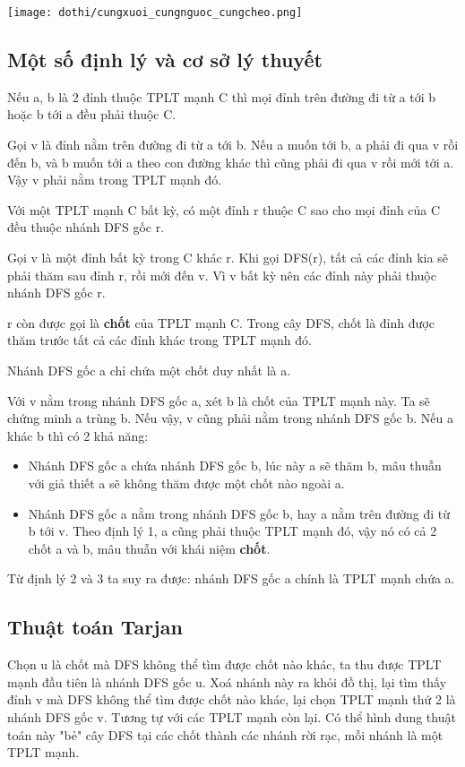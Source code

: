 \texttt{[image: dothi/cungxuoi\_cungnguoc\_cungcheo.png]}

\subsection{Một số định lý và cơ sở lý thuyết}

\begin{theorem}
    Nếu a, b là 2 đỉnh thuộc TPLT mạnh C thì mọi đỉnh trên đường đi từ a tới b hoặc b tới a đều phải thuộc C.
\end{theorem}

Gọi v là đỉnh nằm trên đường đi từ a tới b. Nếu a muốn tới b, a phải đi qua v rồi đến b, và b muốn tới a theo con đường khác thì cũng phải đi qua v rồi mới tới a. Vậy v phải nằm trong TPLT mạnh đó.

\begin{theorem}
    Với một TPLT mạnh C bất kỳ, có một đỉnh r thuộc C sao cho mọi đỉnh của C đều thuộc nhánh DFS gốc r.
\end{theorem}

Gọi v là một đỉnh bất kỳ trong C khác r. Khi gọi DFS(r), tất cả các đỉnh kia sẽ phải thăm sau đỉnh r, rồi mới đến v. Vì v bất kỳ nên các đỉnh này phải thuộc nhánh DFS gốc r.

r còn được gọi là \textbf{chốt} của TPLT mạnh C. Trong cây DFS, chốt là đỉnh được thăm trước tất cả các đỉnh khác trong TPLT mạnh đó.

\begin{theorem}
    Nhánh DFS gốc a chỉ chứa một chốt duy nhất là a.
\end{theorem}

Với v nằm trong nhánh DFS gốc a, xét b là chốt của TPLT mạnh này. Ta sẽ chứng minh a trùng b. Nếu vậy, v cũng phải nằm trong nhánh DFS gốc b. Nếu a khác b thì có 2 khả năng:
\begin{itemize}
    \item Nhánh DFS gốc a chứa nhánh DFS gốc b, lúc này a sẽ thăm b, mâu thuẫn với giả thiết a sẽ không thăm được một chốt nào ngoài a.
    \item Nhánh DFS gốc a nằm trong nhánh DFS gốc b, hay a nằm trên đường đi từ b tới v. Theo định lý 1, a cũng phải thuộc TPLT mạnh đó, vậy nó có cả 2 chốt a và b, mâu thuẫn với khái niệm \textbf{chốt}.
\end{itemize}

Từ định lý 2 và 3 ta suy ra được: nhánh DFS gốc a chính là TPLT mạnh chứa a.

\subsection{Thuật toán Tarjan}
Chọn u là chốt mà DFS không thể tìm được chốt nào khác, ta thu được TPLT mạnh đầu tiên là nhánh DFS gốc u. Xoá nhánh này ra khỏi đồ thị, lại tìm thấy đỉnh v mà DFS không thể tìm được chốt nào khác, lại chọn TPLT mạnh thứ 2 là nhánh DFS gốc v. Tương tự với các TPLT mạnh còn lại. Có thể hình dung thuật toán này "bẻ" cây DFS tại các chốt thành các nhánh rời rạc, mỗi nhánh là một TPLT mạnh.

